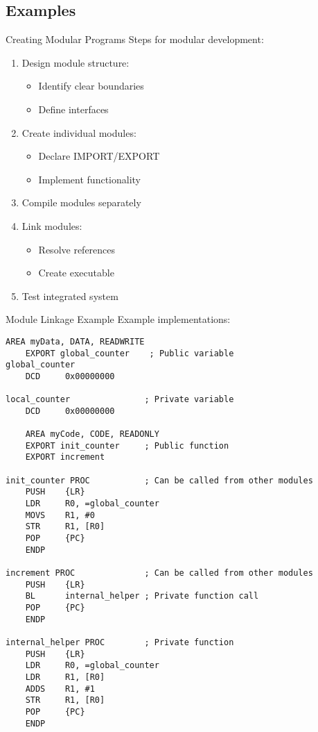 \subsection{Examples}

\begin{KR}{Creating Modular Programs}
Steps for modular development:
\begin{enumerate}
  \item Design module structure:
    \begin{itemize}
      \item Identify clear boundaries
      \item Define interfaces
    \end{itemize}
  \item Create individual modules:
    \begin{itemize}
      \item Declare IMPORT/EXPORT
      \item Implement functionality
    \end{itemize}
  \item Compile modules separately
  \item Link modules:
    \begin{itemize}
      \item Resolve references
      \item Create executable
    \end{itemize}
  \item Test integrated system
\end{enumerate}
\end{KR}







\begin{example2}{Module Linkage Example}
Example implementations:
\begin{lstlisting}[language=armasm, style=basesmol]
    AREA myData, DATA, READWRITE
    EXPORT global_counter    ; Public variable
global_counter
    DCD     0x00000000
    
local_counter               ; Private variable
    DCD     0x00000000

    AREA myCode, CODE, READONLY
    EXPORT init_counter     ; Public function
    EXPORT increment
    
init_counter PROC           ; Can be called from other modules
    PUSH    {LR}
    LDR     R0, =global_counter
    MOVS    R1, #0
    STR     R1, [R0]
    POP     {PC}
    ENDP
    
increment PROC              ; Can be called from other modules
    PUSH    {LR}
    BL      internal_helper ; Private function call
    POP     {PC}
    ENDP
    
internal_helper PROC        ; Private function
    PUSH    {LR}
    LDR     R0, =global_counter
    LDR     R1, [R0]
    ADDS    R1, #1
    STR     R1, [R0]
    POP     {PC}
    ENDP
\end{lstlisting}
\end{example2}

